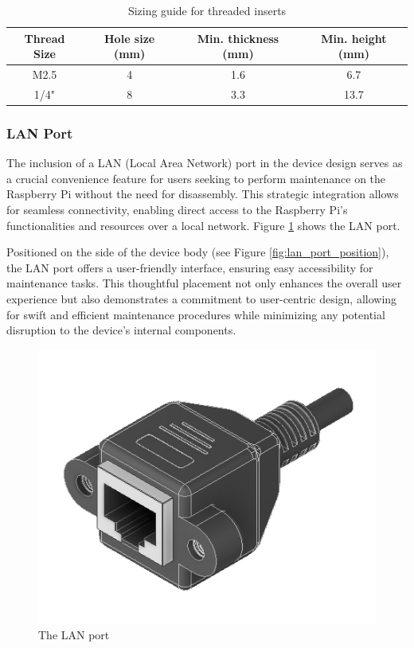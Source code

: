 \begin{table}[!h]
    \centering
    \begin{tabular}{|c|c|c|c|}
        \hline
        \textbf{Thread Size} & \textbf{Hole size (mm)} & \textbf{Min. thickness (mm)} & \textbf{Min. height (mm)} \\ \hline
        M2.5                 & 4                       & 1.6                          & 6.7                       \\ \hline
        1/4"                 & 8                       & 3.3                          & 13.7                      \\ \hline
    \end{tabular}
    \caption{Sizing guide for threaded inserts \cite{ruthex1}\cite{ruthex2}}
    \label{tab:threaded_inserts_sizing_guide}
\end{table}


\subsubsection{LAN Port}

The inclusion of a LAN (Local Area Network) port in the device design serves as a crucial convenience feature for users seeking to perform maintenance on the Raspberry Pi without the need for disassembly. This strategic integration allows for seamless connectivity, enabling direct access to the Raspberry Pi's functionalities and resources over a local network. Figure \ref{fig:lan_port} shows the LAN port.

Positioned on the side of the device body (see Figure \ref{fig:lan_port_position}), the LAN port offers a user-friendly interface, ensuring easy accessibility for maintenance tasks. This thoughtful placement not only enhances the overall user experience but also demonstrates a commitment to user-centric design, allowing for swift and efficient maintenance procedures while minimizing any potential disruption to the device's internal components.

\begin{figure}[h!]
    \centering
    \includegraphics[height=5 cm]{texs/Part1/chapter4/image/d31.png}
    \caption{The LAN port}
    \label{fig:lan_port}
\end{figure}

